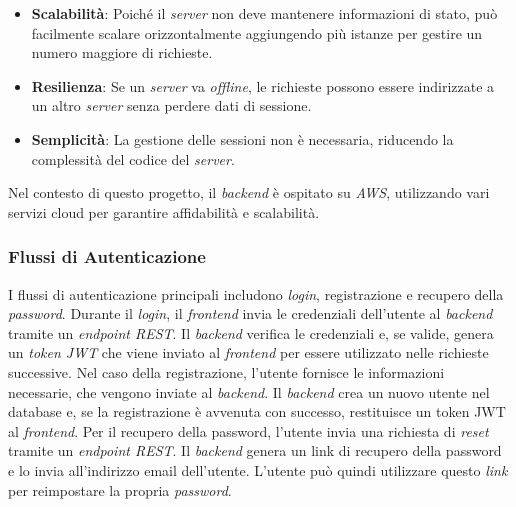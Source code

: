 \begin{itemize}
    \item \textbf{Scalabilità}: Poiché il \textit{server} non deve mantenere informazioni di stato, può facilmente scalare orizzontalmente aggiungendo più istanze per gestire un numero maggiore di richieste.
    \item \textbf{Resilienza}: Se un \textit{server} va \textit{offline}, le richieste possono essere indirizzate a un altro \textit{server} senza perdere dati di sessione.
    \item \textbf{Semplicità}: La gestione delle sessioni non è necessaria, riducendo la complessità del codice del \textit{server}.
\end{itemize}

Nel contesto di questo progetto, il \textit{backend} è ospitato su \textit{AWS}, utilizzando vari servizi cloud per garantire affidabilità e scalabilità.

\subsubsection{Flussi di Autenticazione}
I flussi di autenticazione principali includono \textit{login}, registrazione e recupero della \textit{password}.
Durante il \textit{login}, il \textit{frontend} invia le credenziali dell'utente al \textit{backend} tramite un \textit{endpoint REST}.
Il \textit{backend} verifica le credenziali e, se valide, genera un \textit{token JWT} che viene inviato al \textit{frontend} per essere utilizzato nelle richieste successive. 
Nel caso della registrazione, l'utente fornisce le informazioni necessarie, che vengono inviate al \textit{backend}.
Il \textit{backend} crea un nuovo utente nel database e, se la registrazione è avvenuta con successo, restituisce un token JWT al \textit{frontend}.
Per il recupero della password, l'utente invia una richiesta di \textit{reset} tramite un \textit{endpoint REST}.
Il \textit{backend} genera un link di recupero della password e lo invia all'indirizzo email dell'utente.
L'utente può quindi utilizzare questo \textit{link} per reimpostare la propria \textit{password}.

